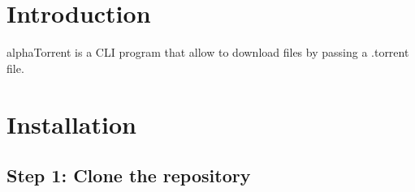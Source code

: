 \hypertarget{index_intro_sec}{}\section{Introduction}\label{index_intro_sec}
alpha\+Torrent is a C\+LI program that allow to download files by passing a .torrent file.\hypertarget{index_install_sec}{}\section{Installation}\label{index_install_sec}
\hypertarget{index_step1}{}\subsection{Step 1\+: Clone the repository}\label{index_step1}
